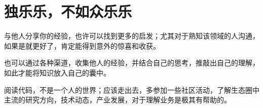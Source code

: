 \section{独乐乐，不如众乐乐}

\begin{content}

与他人分享你的经验，也许可以找到更多的启发；尤其对于熟知该领域的人沟通，如果是就更好了，肯定能得到意外的惊喜和收获。

也可以通过各种渠道，收集他人的经验，并结合自己的思考，推敲出自己的理解，如此才能将知识放入自己的囊中。

阅读代码，不是一个人的世界；应该走出去，多参加一些社区活动，了解生态圈中主流的研究方向，技术动态，产业发展，对于理解业务是极其有帮助的。


\end{content}

